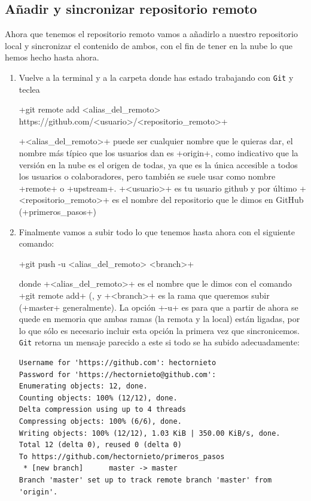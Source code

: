 \documentclass[a4paper,10pt]{article}
\begin{document}
    \subsection{Añadir y sincronizar repositorio remoto}
      Ahora que tenemos el repositorio remoto vamos a añadirlo a nuestro repositorio local y sincronizar el contenido de ambos, con el fin de tener en la nube lo que hemos hecho hasta ahora. 
      \begin{enumerate}
       \item Vuelve a la terminal y a la carpeta donde has estado trabajando con \verb+Git+ y teclea
       
       \cverb+git remote add <alias_del_remoto> https://github.com/<usuario>/<repositorio_remoto>+
       
       \cverb+<alias_del_remoto>+ puede ser cualquier nombre que le quieras dar, el nombre más típico que los usuarios dan es \cverb+origin+, como indicativo que la versión en la nube es el origen de todas, ya que es la única accesible a todos los usuarios o colaboradores, pero también se suele usar como nombre \cverb+remote+ o \cverb+upstream+. \cverb+<usuario>+ es tu usuario github y por último \cverb+<repositorio_remoto>+ es el nombre del repositorio que le dimos en GitHub (\cverb+primeros_pasos+)
       
       \item Finalmente vamos a subir todo lo que tenemos hasta ahora con el siguiente comando:
       
       \cverb+git push -u <alias_del_remoto> <branch>+
       
       donde \cverb+<alias_del_remoto>+ es el nombre que le dimos con el comando \cverb+git remote add+ (, y \cverb+<branch>+ es la rama que queremos subir (\cverb+master+ generalmente). La opción \cverb+-u+ es para que a partir de ahora se quede en memoria que ambas ramas (la remota y la local) están ligadas, por lo que sólo es necesario incluir esta opción la primera vez que sincronicemos. \verb+Git+ retorna un mensaje parecido a este si todo se ha subido adecuadamente:
       \begin{lstlisting}[style=custom]
Username for 'https://github.com': hectornieto
Password for 'https://hectornieto@github.com': 
Enumerating objects: 12, done.
Counting objects: 100% (12/12), done.
Delta compression using up to 4 threads
Compressing objects: 100% (6/6), done.
Writing objects: 100% (12/12), 1.03 KiB | 350.00 KiB/s, done.
Total 12 (delta 0), reused 0 (delta 0)
To https://github.com/hectornieto/primeros_pasos
 * [new branch]      master -> master
Branch 'master' set up to track remote branch 'master' from 'origin'.
      \end{lstlisting}
      

\end{enumerate}
\end{document}
